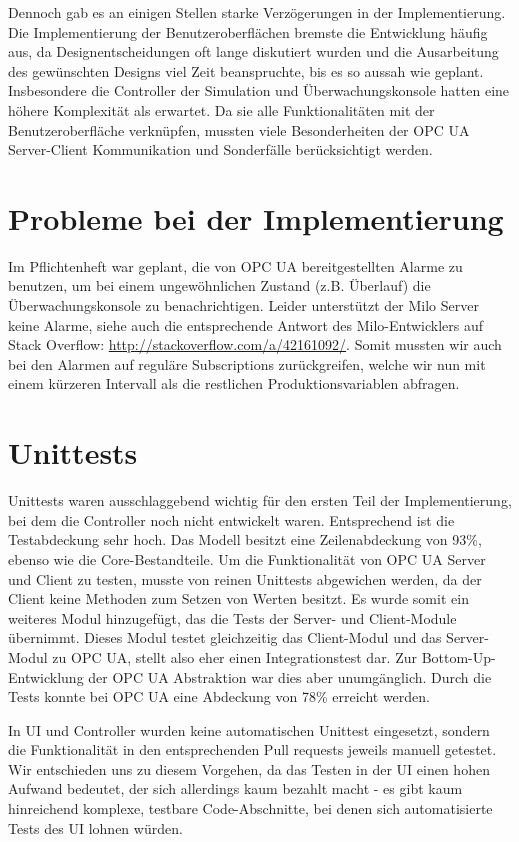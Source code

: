 \documentclass[parskip=full]{scrartcl}
\begin{document}
Dennoch gab es an einigen Stellen starke Verzögerungen in der Implementierung.
Die Implementierung der Benutzeroberflächen bremste die Entwicklung häufig aus, da Designentscheidungen oft lange
diskutiert wurden und die Ausarbeitung des gewünschten Designs viel Zeit beanspruchte, bis es so aussah wie geplant.
Insbesondere die Controller der Simulation und Überwachungskonsole hatten eine höhere Komplexität als erwartet.
Da sie alle Funktionalitäten mit der Benutzeroberfläche verknüpfen, mussten viele Besonderheiten der OPC UA Server-Client Kommunikation und Sonderfälle berücksichtigt werden.

\section{Probleme bei der Implementierung}
Im Pflichtenheft war geplant, die von OPC UA bereitgestellten Alarme zu benutzen, um bei einem ungewöhnlichen Zustand (z.B. Überlauf)
die Überwachungskonsole zu benachrichtigen. Leider unterstützt der Milo Server keine Alarme, siehe auch die entsprechende Antwort
des Milo-Entwicklers auf Stack Overflow: \href{http://stackoverflow.com/a/42161092/}{http://stackoverflow.com/a/42161092/}.
Somit mussten wir auch bei den Alarmen auf reguläre Subscriptions zurückgreifen, welche wir nun mit einem kürzeren Intervall
als die restlichen Produktionsvariablen abfragen.

\section{Unittests}
Unittests waren ausschlaggebend wichtig für den ersten Teil der Implementierung, bei dem die Controller noch nicht entwickelt waren.
Entsprechend ist die Testabdeckung sehr hoch. Das Modell besitzt eine Zeilenabdeckung von 93\%, ebenso wie die Core-Bestandteile.
Um die Funktionalität von OPC UA Server und Client zu testen, musste von reinen Unittests abgewichen werden, da der Client keine
Methoden zum Setzen von Werten besitzt. Es wurde somit ein weiteres Modul hinzugefügt, das die Tests der Server- und Client-Module übernimmt.
Dieses Modul testet gleichzeitig das Client-Modul und das Server-Modul zu OPC UA, stellt also eher einen Integrationstest dar. Zur Bottom-Up-Entwicklung der OPC UA Abstraktion war dies aber unumgänglich. Durch die Tests konnte bei OPC UA eine Abdeckung von 78\% erreicht werden.

In UI und Controller wurden keine automatischen Unittest eingesetzt, sondern die Funktionalität in den entsprechenden Pull requests
jeweils manuell getestet. Wir entschieden uns zu diesem Vorgehen, da das Testen in der UI einen hohen Aufwand bedeutet, der sich allerdings
kaum bezahlt macht - es gibt kaum hinreichend komplexe, testbare Code-Abschnitte, bei denen sich automatisierte Tests des UI lohnen würden.

\pagebreak
{}
{}
\listoffigures
\end{document}

